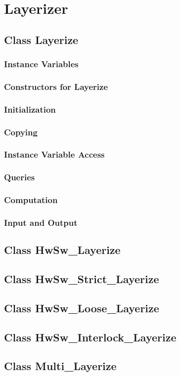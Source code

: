 \section{Layerizer}
\subsection{Class Layerize}
\subsubsection{Instance Variables}
\subsubsection{Constructors for Layerize}
\subsubsection{Initialization}
\subsubsection{Copying}
\subsubsection{Instance Variable Access}
\subsubsection{Queries}
\subsubsection{Computation}
\subsubsection{Input and Output}
\subsection{Class HwSw_Layerize}
\subsection{Class HwSw_Strict_Layerize}
\subsection{Class HwSw_Loose_Layerize}
\subsection{Class HwSw_Interlock_Layerize}
\subsection{Class Multi_Layerize}
